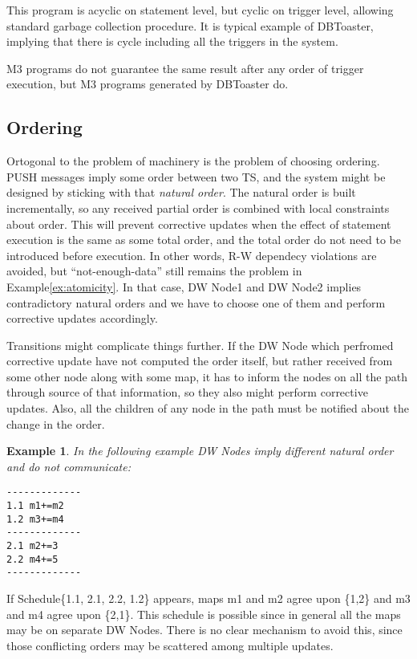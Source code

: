\documentclass{sig-semester}
\newtheorem{example}[theorem]{Example}
\begin{document}
This program is acyclic on statement level, but cyclic on trigger level, allowing standard garbage collection procedure. It is typical example of DBToaster, implying that there is cycle including all the triggers in the system.

M3 programs do not guarantee the same result after any order of trigger execution, but M3 programs generated by DBToaster do.

\subsection{Ordering} Ortogonal to the problem of machinery is the problem of choosing ordering. PUSH messages imply some order between two TS, and the system might be designed by sticking with that \textit{natural order}. The natural order is built incrementally, so any received partial order is combined with local constraints about order. This will prevent corrective updates when the effect of statement execution is the same as some total order, and the total order do not need to be introduced before execution. In other words, R-W dependecy violations are avoided, but ``not-enough-data'' still remains the problem in Example\ref{ex:atomicity}. In that case, DW Node1 and DW Node2 implies contradictory natural orders and we have to choose one of them and perform corrective updates accordingly. 

Transitions might complicate things further. If the DW Node which perfromed corrective update have not computed the order itself, but rather received from some other node along with some map, it has to inform the nodes on all the path through source of that information, so they also might perform corrective updates. Also, all the children of any node in the path must be notified about the change in the order.

\begin{example} \em
\label{ex:atomicity2}
In the following example DW Nodes imply different natural order and do not communicate:
\begin{verbatim}
-------------
1.1 m1+=m2
1.2 m3+=m4
-------------
2.1 m2+=3
2.2 m4+=5
-------------
\end{verbatim}
\end{example}
If Schedule\{1.1, 2.1, 2.2, 1.2\} appears, maps m1 and m2 agree upon \{1,2\} and m3 and m4 agree upon \{2,1\}. This schedule is possible since in general all the maps may be on separate DW Nodes. There is no clear mechanism to avoid this, since those conflicting orders may be scattered among multiple updates.
\end{document}
